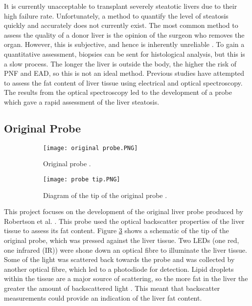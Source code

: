 It is currently unacceptable to transplant severely steatotic livers due to their high failure rate. Unfortunately, a method to quantify the level of steatosis quickly and accurately does not currently exist. The most common method to assess the quality of a donor liver is the opinion of the surgeon who removes the organ. However, this is subjective, and hence is inherently unreliable \cite{Robertson}. To gain a quantitative assessment, biopsies can be sent for histological analysis, but this is a slow process. The longer the liver is outside the body, the higher the risk of PNF and EAD, so this is not an ideal method. Previous studies \cite{McLaughlin2010} have attempted to assess the fat content of liver tissue using electrical and optical spectroscopy. The results from the optical spectroscopy led to the development of a probe \cite{Robertson} which gave a rapid assessment of the liver steatosis. 


\subsection{Original Probe}

\begin{figure}[htb]
	\centering
	\begin{subfigure}[b]{0.3\linewidth}
		\texttt{[image: original probe.PNG]}
		\caption{Original probe \cite{Robertson}.}
		\label{fig: original probe}
	\end{subfigure}
	\begin{subfigure}[b]{0.5\linewidth}
		\texttt{[image: probe tip.PNG]}
		\caption{Diagram of the tip of the original probe \cite{Robertson}.}
		\label{fig: probe tip}
	\end{subfigure}
	\caption{}
\end{figure}

This project focuses on the development of the original liver probe produced by Robertson et al. \cite{Robertson}. This probe used the optical backscatter properties of the liver tissue to assess its fat content. Figure \ref{fig: probe tip} shows a schematic of the tip of the original probe, which was pressed against the liver tissue. Two LEDs (one red, one infrared (IR)) were shone down an optical fibre to illuminate the liver tissue. Some of the light was scattered back towards the probe and was collected by another optical fibre, which led to a photodiode for detection. Lipid droplets within the tissue are a major source of scattering, so the more fat in the liver the greater the amount of backscattered light \cite{McLaughlin}. This meant that backscatter measurements could provide an indication of the liver fat content.\\


